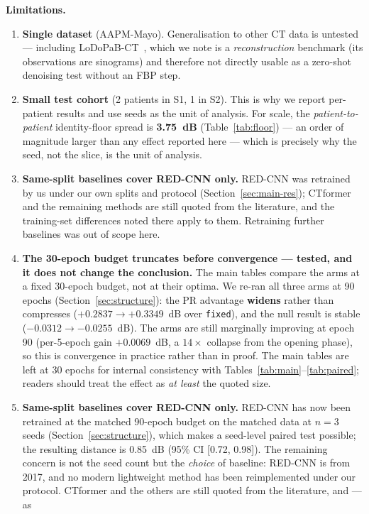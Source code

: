 \documentclass[conference]{IEEEtran}
\begin{document}
\textbf{Limitations.}
\begin{enumerate}
\item \textbf{Single dataset} (AAPM-Mayo). Generalisation to other CT data is
untested --- including LoDoPaB-CT~\cite{leuschner2021lodopab}, which we note is a
\emph{reconstruction} benchmark (its observations are sinograms) and therefore
not directly usable as a zero-shot denoising test without an FBP step.
\item \textbf{Small test cohort} (2 patients in S1, 1 in S2). This is why we
report per-patient results and use seeds as the unit of analysis. For scale, the
\emph{patient-to-patient} identity-floor spread is \textbf{3.75~dB}
(Table~\ref{tab:floor}) --- an order of magnitude larger than any effect reported
here --- which is precisely why the seed, not the slice, is the unit of analysis.
\item \textbf{Same-split baselines cover RED-CNN only.} RED-CNN was retrained by
us under our own splits and protocol (Section~\ref{sec:main-res}); CTformer and
the remaining methods are still quoted from the literature, and the
training-set differences noted there apply to them. Retraining further baselines
was out of scope here.
\item \textbf{The 30-epoch budget truncates before convergence --- tested, and it
does not change the conclusion.} The main tables compare the arms at a fixed
30-epoch budget, not at their optima. We re-ran all three arms at 90 epochs
(Section~\ref{sec:structure}): the PR advantage \textbf{widens} rather than
compresses ($+0.2837 \to +0.3349$~dB over \texttt{fixed}), and the null result is
stable ($-0.0312 \to -0.0255$~dB). The arms are still marginally improving at
epoch 90 (per-5-epoch gain $+0.0069$~dB, a $14\times$ collapse from the opening
phase), so this is convergence in practice rather than in proof. The main tables
are left at 30 epochs for internal consistency with
Tables~\ref{tab:main}--\ref{tab:paired}; readers should treat the effect as
\emph{at least} the quoted size.
\item \textbf{Same-split baselines cover RED-CNN only.} RED-CNN has now been
retrained at the matched 90-epoch budget on the matched data at $n=3$ seeds
(Section~\ref{sec:structure}), which makes a seed-level paired test possible; the
resulting distance is 0.85~dB (95\% CI [0.72, 0.98]). The remaining concern is
not the seed count but the \emph{choice} of baseline: RED-CNN is from 2017, and
no modern lightweight method has been reimplemented under our protocol. CTformer
and the others are still quoted from the literature, and --- as

\end{enumerate}
\end{document}
